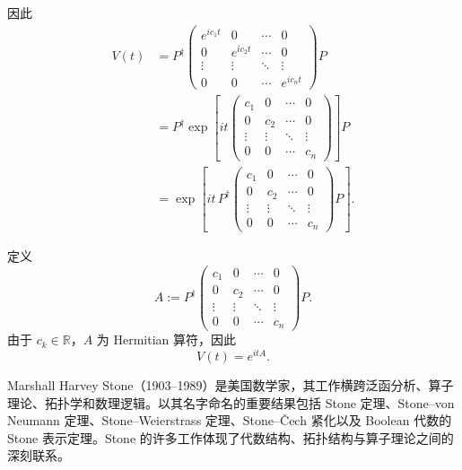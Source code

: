 \documentclass[UTF8,a4paper,11pt,openany]{ctexbook}
\begin{document}
因此
\begin{align}
    V(t)
    &=
    P^\dagger
    \begin{pmatrix}
        e^{ic_1t} & 0 & \cdots & 0\\
        0 & e^{ic_2t} & \cdots & 0\\
        \vdots & \vdots & \ddots & \vdots\\
        0 & 0 & \cdots & e^{ic_nt}
    \end{pmatrix}
    P
    \nonumber\\
    &=
    P^\dagger
    \exp\left[
        it
        \begin{pmatrix}
            c_1 & 0 & \cdots & 0\\
            0 & c_2 & \cdots & 0\\
            \vdots & \vdots & \ddots & \vdots\\
            0 & 0 & \cdots & c_n
        \end{pmatrix}
    \right]
    P
    \nonumber\\
    &=
    \exp\left[
        it\,
        P^\dagger
        \begin{pmatrix}
            c_1 & 0 & \cdots & 0\\
            0 & c_2 & \cdots & 0\\
            \vdots & \vdots & \ddots & \vdots\\
            0 & 0 & \cdots & c_n
        \end{pmatrix}
        P
    \right].
\end{align}

定义
\begin{equation}
    A
    :=
    P^\dagger
    \begin{pmatrix}
        c_1 & 0 & \cdots & 0\\
        0 & c_2 & \cdots & 0\\
        \vdots & \vdots & \ddots & \vdots\\
        0 & 0 & \cdots & c_n
    \end{pmatrix}
    P.
\end{equation}
由于 $c_k\in\mathbb R$，$A$ 为 Hermitian 算符，因此
\begin{equation}
    V(t)=e^{itA}.
\end{equation}

\begin{tcolorbox}[
    enhanced,
    breakable,
    colback=white,
    colframe=black!45,
    boxrule=0.7pt,
    arc=1mm,
    left=2mm,
    right=2mm,
    top=1.5mm,
    bottom=1.5mm,
    title={Marshall Harvey Stone},
    fonttitle=\bfseries
]
Marshall Harvey Stone（1903--1989）是美国数学家，其工作横跨泛函分析、算子理论、拓扑学和数理逻辑。以其名字命名的重要结果包括 Stone 定理、Stone--von Neumann 定理、Stone--Weierstrass 定理、Stone--Čech 紧化以及 Boolean 代数的 Stone 表示定理。Stone 的许多工作体现了代数结构、拓扑结构与算子理论之间的深刻联系。
\end{tcolorbox}
\end{document}
